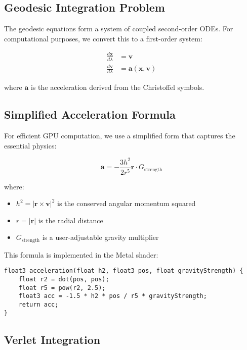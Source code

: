 \documentclass[12pt,a4paper]{article}
\theoremstyle{definition}
\theoremstyle{remark}
\begin{document}
\subsection{Geodesic Integration Problem}

The geodesic equations form a system of coupled second-order ODEs. For computational purposes, we convert this to a first-order system:

\begin{align}
    \frac{d\mathbf{x}}{d\lambda} &= \mathbf{v} \\
    \frac{d\mathbf{v}}{d\lambda} &= \mathbf{a}(\mathbf{x}, \mathbf{v})
\end{align}

where $\mathbf{a}$ is the acceleration derived from the Christoffel symbols.

\subsection{Simplified Acceleration Formula}

For efficient GPU computation, we use a simplified form that captures the essential physics:

\begin{equation}
    \mathbf{a} = -\frac{3h^2}{2r^5}\mathbf{r} \cdot G_{\text{strength}}
\end{equation}

where:
\begin{itemize}
    \item $h^2 = |\mathbf{r} \times \mathbf{v}|^2$ is the conserved angular momentum squared
    \item $r = |\mathbf{r}|$ is the radial distance
    \item $G_{\text{strength}}$ is a user-adjustable gravity multiplier
\end{itemize}

This formula is implemented in the Metal shader:

\begin{lstlisting}[style=metalstyle, caption=Acceleration calculation in Metal]
float3 acceleration(float h2, float3 pos, float gravityStrength) {
    float r2 = dot(pos, pos);
    float r5 = pow(r2, 2.5);
    float3 acc = -1.5 * h2 * pos / r5 * gravityStrength;
    return acc;
}
\end{lstlisting}

\subsection{Verlet Integration}
\end{document}

